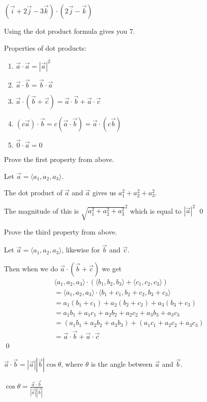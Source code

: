 \documentclass[../calc3.tex]{subfiles}
\begin{document}
\begin{example}
    $(\vec{i}+2\vec{j}-3\vec{k})\cdot (2\vec{j}-\vec{k})$

    Using the dot product formula gives you $7$.
\end{example}

Properties of dot products:
\begin{enumerate}
    \item $\vec{a}\cdot \vec{a} = |\vec{a}|^2$
    \item $\vec{a}\cdot \vec{b} = \vec{b}\cdot \vec{a}$
    \item $\vec{a}\cdot (\vec{b}+\vec{c})=\vec{a}\cdot \vec{b}+\vec{a}\cdot \vec{c}$
    \item $(c\vec{a})\cdot \vec{b}=c(\vec{a}\cdot \vec{b})=\vec{a}\cdot (c\vec{b})$
    \item $\vec{0}\cdot \vec{a}=0$
\end{enumerate}

\begin{example}
    Prove the first property from above.

    Let $\vec{a}=\langle a_1,a_2,a_3\rangle$.

    The dot product of $\vec{a}$ and $\vec{a}$ gives us $a_1^2+a_2^2+a_3^2$.

    The magnitude of this is $\sqrt{a_1^2+a_2^2+a_3^2}^2$ which is equal to $|\vec{a}|^2$ \qed
\end{example}

\begin{example}
    Prove the third property from above.

    Let $\vec{a}=\langle a_1,a_2,a_3\rangle$, likewise for $\vec{b}$ and $\vec{c}$.

    Then when we do $\vec{a}\cdot (\vec{b}+\vec{c})$ we get 
    \begin{align*}
        \langle a_1,a_2,a_3\rangle \cdot (\langle b_1,b_2,b_3\rangle + \langle c_1,c_2,c_3\rangle)\\
        = \langle a_1,a_2,a_3\rangle \cdot \langle b_1+c_1, b_2+c_2, b_3+c_3\rangle\\
        = a_1(b_1+c_1)+a_2(b_2+c_2)+a_3(b_3+c_3)\\
        = a_1b_1+a_1c_1+a_2b_2+a_2c_2+a_3b_3+a_3c_3\\
        = (a_1b_1+a_2b_2+a_3b_3)+(a_1c_1+a_2c_2+a_3c_3)\\
        = \vec{a}\cdot \vec{b}+\vec{a}\cdot \vec{c} 
    \end{align*}\qed 
\end{example}
\pagebreak
\begin{theorem}
    $\vec{a}\cdot \vec{b}=|\vec{a}||\vec{b}|\cos\theta$, where $\theta$ is the angle between $\vec{a}$ and $\vec{b}$.
\end{theorem}
\begin{corollary}
    $\cos\theta = \frac{\vec{a}\cdot \vec{b}}{|\vec{a}||\vec{b}|}$
\end{corollary}
\end{document}
